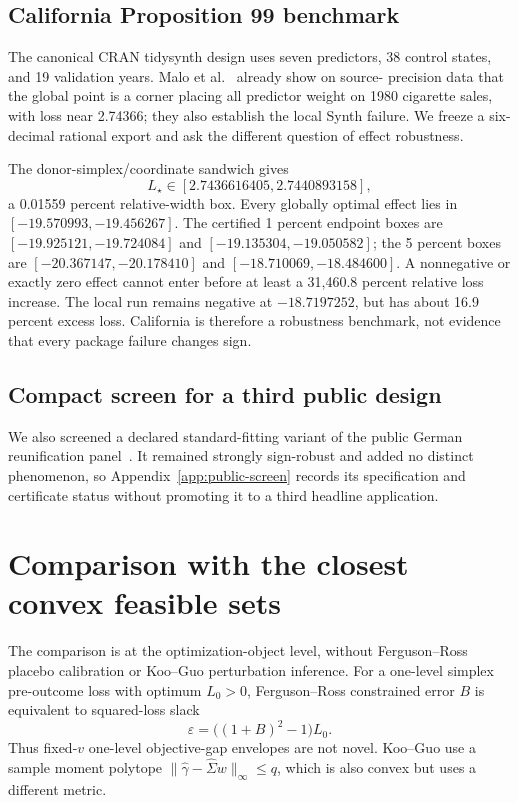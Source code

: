 \documentclass[10pt]{article}
\theoremstyle{definition}
\newcommand{\eps}{\varepsilon}
\begin{document}
\subsection{California Proposition 99 benchmark}

The canonical CRAN \textsf{tidysynth} design uses seven predictors, 38 control
states, and 19 validation years.  Malo et al.~\cite{malo2024} already show on source-
precision data that the global point is a corner placing all predictor weight
on 1980 cigarette sales, with loss near 2.74366; they also establish the local
\textsf{Synth} failure.  We freeze a six-decimal rational export and ask the
different question of effect robustness.

The donor-simplex/coordinate sandwich gives
\[
 L_\star\in[2.7436616405,2.7440893158],
\]
a 0.01559 percent relative-width box.  Every globally optimal effect lies in
$[-19.570993,-19.456267]$.  The certified 1 percent endpoint boxes are
$[-19.925121,-19.724084]$ and $[-19.135304,-19.050582]$; the 5 percent boxes
are $[-20.367147,-20.178410]$ and $[-18.710069,-18.484600]$.  A nonnegative or
exactly zero effect cannot enter before at least a 31,460.8 percent relative
loss increase.  The local run remains negative at $-18.7197252$, but has about
16.9 percent excess loss.  California is therefore a robustness benchmark, not
evidence that every package failure changes sign.

\subsection{Compact screen for a third public design}

We also screened a declared standard-fitting variant of the public German
reunification panel~\cite{abadie2015}.  It remained strongly sign-robust and
added no distinct phenomenon, so Appendix~\ref{app:public-screen} records its
specification and certificate status without promoting it to a third headline
application.

\section{Comparison with the closest convex feasible sets}

The comparison is at the optimization-object level, without Ferguson--Ross
placebo calibration or Koo--Guo perturbation inference.  For a one-level
simplex pre-outcome loss with optimum $L_0>0$, Ferguson--Ross constrained error
$B$ is equivalent to squared-loss slack
\[
 \eps=\bigl((1+B)^2-1\bigr)L_0.
\]
Thus fixed-$v$ one-level objective-gap envelopes are not novel.  Koo--Guo use a
sample moment polytope $\lVert\widehat\gamma-\widehat\Sigma w\rVert_\infty\le q$,
which is also convex but uses a different metric.
\end{document}
